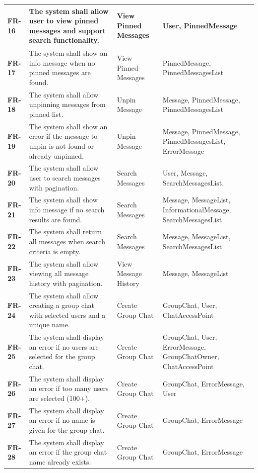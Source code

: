 \documentclass[]{VUMIFTemplateClass}
\begin{document}
\begin{longtable}{|p{3cm}|p{5.5cm}|l|p{4cm}|}
\hline
\textbf{FR-16} & The system shall allow user to view pinned messages and support search functionality. & View Pinned Messages & User, PinnedMessage \\
\hline
\textbf{FR-17} & The system shall show an info message when no pinned messages are found. & View Pinned Messages & PinnedMessage, PinnedMessagesList \\
\hline
\textbf{FR-18} & The system shall allow unpinning messages from pinned list. & Unpin Message & Message, PinnedMessage, PinnedMessagesList \\
\hline
\textbf{FR-19} & The system shall show an error if the message to unpin is not found or already unpinned. & Unpin Message & Message, PinnedMessage, PinnedMessagesList, ErrorMessage \\
\hline
\textbf{FR-20} & The system shall allow user to search messages with pagination. & Search Messages & User, Message, SearchMessagesList, \\
\hline
\textbf{FR-21} & The system shall show info message if no search results are found. & Search Messages & Message, MessageList, InformationalMessage, SearchMessagesList \\
\hline
\textbf{FR-22} & The system shall return all messages when search criteria is empty. & Search Messages & Message, MessageList, SearchMessagesList \\
\hline
\textbf{FR-23} & The system shall allow viewing all message history with pagination. & View Message History & Message, MessageList \\
\hline
\textbf{FR-24} & The system shall allow creating a group chat with selected users and a unique name. & Create Group Chat & GroupChat, User, ChatAccessPoint \\
\hline
\textbf{FR-25} & The system shall display an error if no users are selected for the group chat. & Create Group Chat & GroupChat, User, ErrorMessage, GroupChatOwner, ChatAccessPoint \\
\hline
\textbf{FR-26} & The system shall display an error if too many users are selected (100+). & Create Group Chat & GroupChat, ErrorMessage, User \\
\hline
\textbf{FR-27} & The system shall display an error if no name is given for the group chat. & Create Group Chat & GroupChat, ErrorMessage \\
\hline
\textbf{FR-28} & The system shall display an error if the group chat name already exists. & Create Group Chat & GroupChat, ErrorMessage \\
\hline

\end{longtable}
\end{document}
